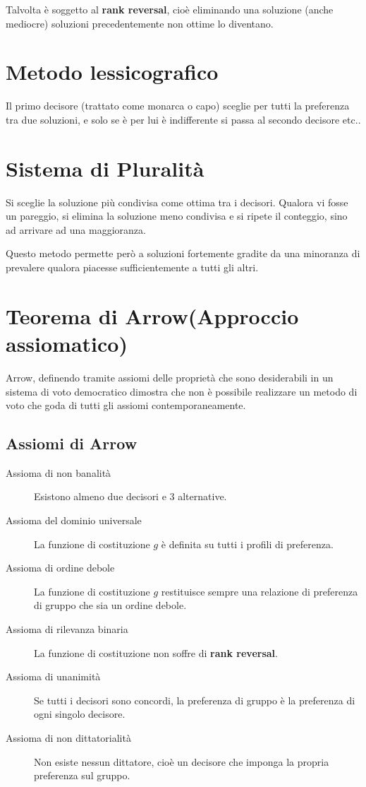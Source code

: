 \documentclass[\main/main.tex]{subfiles}
\begin{document}
Talvolta è soggetto al \textbf{rank reversal}, cioè eliminando una soluzione (anche mediocre) soluzioni precedentemente non ottime lo diventano.

\section{Metodo lessicografico}
Il primo decisore (trattato come monarca o capo) sceglie per tutti la preferenza tra due soluzioni, e solo se è per lui è indifferente si passa al secondo decisore etc..

\section{Sistema di Pluralità}
Si sceglie la soluzione più condivisa come ottima tra i decisori. Qualora vi fosse un pareggio, si elimina la soluzione meno condivisa e si ripete il conteggio, sino ad arrivare ad una maggioranza.

Questo metodo permette però a soluzioni fortemente gradite da una minoranza di prevalere qualora piacesse sufficientemente a tutti gli altri.

\section{Teorema di Arrow(Approccio assiomatico)}
Arrow, definendo tramite assiomi delle proprietà che sono desiderabili in un sistema di voto democratico dimostra che non è possibile realizzare un metodo di voto che goda di tutti gli assiomi contemporaneamente.

\subsection{Assiomi di Arrow}
\begin{description}
  \item[Assioma di non banalità] Esistono almeno due decisori e 3 alternative.
  \item[Assioma del dominio universale] La funzione di costituzione $g$ è definita su tutti i profili di preferenza.
  \item[Assioma di ordine debole] La funzione di costituzione $g$ restituisce sempre una relazione di preferenza di gruppo che sia un ordine debole.
  \item[Assioma di rilevanza binaria] La funzione di costituzione non soffre di \textbf{rank reversal}.
  \item[Assioma di unanimità] Se tutti i decisori sono concordi, la preferenza di gruppo è la preferenza di ogni singolo decisore.
  \item[Assioma di non dittatorialità] Non esiste nessun dittatore, cioè un decisore che imponga la propria preferenza sul gruppo.
\end{description}
\end{document}
